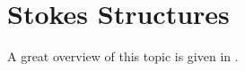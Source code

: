 \chapter{Stokes Structures}
\begin{comment}
  Matrizen Sicht:
  \begin{itemize}
    \item \cite[Chapter 3]{boalch}
      \\ largely following:
      \begin{itemize}
        \item[\textbf{8}] D.G. Babbitt and V.S. Varadarajan.
        \textbf{Formal reduction theory of meromorphic differential equations:
          a group theoretic view.}
        \texttt{euclid.pjm.1102720203.pdf}
        \item[\textbf{11}] \cite{BJL1979Birkhoff}
        \item[\textbf{40}] M. Jimbo, T. Miwa, and Kimio Ueno.
        \textbf{Monodromy preserving deformations of linear differential
          equations with rational coefficients I.}
        \item[\textbf{43}] \cite{Loday1994}
        \item[\textbf{50}] J. Martinet and J.P. Ramis.
        \textbf{Elementary acceleration and multisummability.}
      \end{itemize}
    \item \cite{thboalch}
    \item \cite{van2003galois}
    \item Marius van der Put, Kyoshi Saito => Diff.Galois Theory
  \end{itemize}
  Moderne Sicht (sheaf-view):
  \begin{itemize}
    \item Malgrange
    \item \cite{sabbah_cimpa90} and
    \item \cite{sabbah2007isomonodromic}
    \item \cite{sabbah2009introduction} and \cite{sabbah2013introduction}
  \end{itemize}
  and
  \begin{itemize}
    \item \cite{LodayRichaud2004}
    \item \cite{Loday2014}
  \end{itemize}
  See also:
  \begin{itemize}
    \item \cite{Loday1994} for \textbf{Sheaf $\to$ Matrix}
    \item \cite{Varadarajan96linearmeromorphic} for \textbf{overview of both}
    \item \cite{sibuya1990Linear} looks at $\infty$
    \item \cite{BJL1979Birkhoff} looks at $\infty$
  \end{itemize}
\end{comment}
A great overview of this topic is given in
\cite{Varadarajan96linearmeromorphic}.

